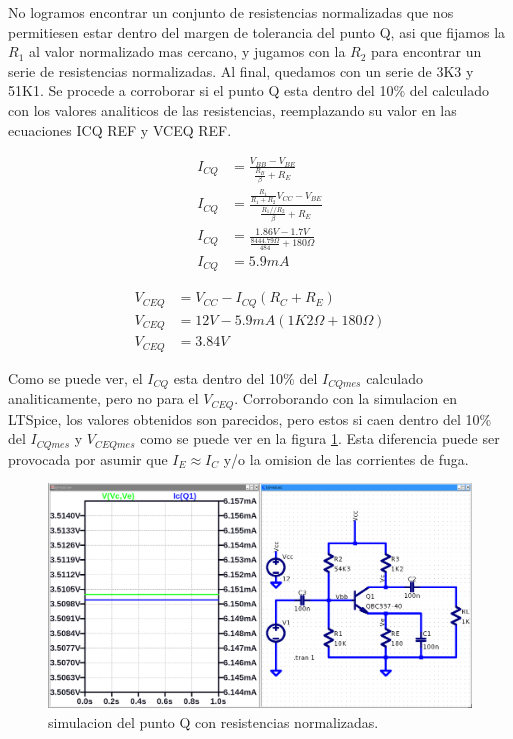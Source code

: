   No logramos encontrar un conjunto de resistencias normalizadas que nos permitiesen estar dentro del margen de
  tolerancia del punto Q, asi que fijamos la $R_1$ al valor normalizado mas cercano, y jugamos con la $R_2$ para
  encontrar un serie de resistencias normalizadas. Al final, quedamos con un serie de 3K3 y 51K1. Se procede a corroborar
  si el punto Q esta dentro del 10\% del calculado con los valores analiticos de las resistencias, reemplazando su
  valor en las ecuaciones \warn ICQ REF y VCEQ REF.

  \begin{figure}[!ht]
    \centering
    \begin{minipage}{0.49\textwidth}
      \begin{align*}
        I_{CQ} &= \frac{V_{BB} - V_{BE}}{\frac{R_B}{\beta} + R_E}\\[6pt]
        I_{CQ} &= \frac{\frac{R_1}{R_1 + R_2} V_{CC} - V_{BE}}{\frac{R_1//R_2}{\beta} + R_E}\\[6pt]
        I_{CQ} &= \frac{1.86V - 1.7V}{\frac{8444.79 \Omega}{484} + 180 \Omega}\\[6pt]
        I_{CQ} &= 5.9 mA
      \end{align*}
    \end{minipage}
    \begin{minipage}{0.49\textwidth}
      \begin{align*}
        V_{CEQ} &= V_{CC} - I_{CQ} \left(R_C + R_E \right)\\[6pt]
        V_{CEQ} &= 12V - 5.9mA \left(1K2 \Omega + 180 \Omega \right)\\[6pt]
        V_{CEQ} &= 3.84V
      \end{align*}
    \end{minipage}
  \end{figure}

  Como se puede ver, el $I_{CQ}$ esta dentro del 10\% del $I_{CQ mes}$ calculado analiticamente, pero no para el
  $V_{CEQ}$. Corroborando con la simulacion en LTSpice, los valores obtenidos son parecidos, pero estos si caen dentro
  del 10\% del $I_{CQ mes}$ y $V_{CEQ mes}$ como se puede ver en la figura \ref{fig:pto_q_normalizado}. Esta diferencia
  puede ser provocada por asumir que $I_E \approx I_C$ y/o la omision de las corrientes de fuga.

  \begin{figure}[!ht]
    \centering
    \includegraphics[width=.9\textwidth]{images/pto_q_normalizado.png}
    \caption{simulacion del punto Q con resistencias normalizadas.}
    \label{fig:pto_q_normalizado}
  \end{figure}

